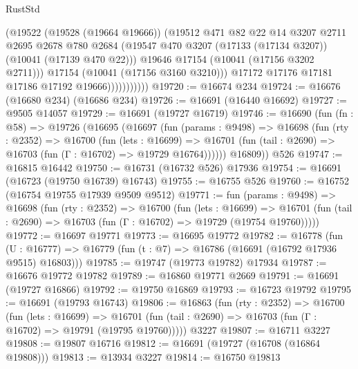 \begin{lexlean}{RustStd}
\begin{coremodule}
                          (@19522
                            (@19528 (@19664 @19666))
                            (@19512
                              @471
                              @82
                              @22
                              @14
                              @3207
                              @2711
                              @2695
                              @2678
                              @780
                              @2684
                              (@19547 @470 @3207 (@17133 (@17134 @3207)) (@10041 (@17139 @470 @22)))
                              @19646
                              @17154
                              (@10041 (@17156 @3202 @2711)))
                            @17154
                            (@10041 (@17156 @3160 @3210)))
                          @17172
                          @17176
                          @17181
                          @17186
                          @17192
                          @19666)))))))))))
@19720 := @16674 @234
@19724 := @16676 (@16680 @234) (@16686 @234)
@19726 := @16691 (@16440 @16692)
@19727 := @9505 @14057
@19729 := @16691 (@19727 @16719)
@19746 := @16690
    (fun (fn : @58) =>
    @19726
      (@16695
        (@16697
          (fun (params : @9498) =>
          @16698
            (fun (rty : @2352) =>
            @16700
              (fun (lets : @16699) =>
              @16701 (fun (tail : @2690) => @16703 (fun (Γ : @16702) => @19729 @16764))))))
        @16809))
    @526
@19747 := @16815 @16442
@19750 := @16731 (@16732 @526) @17936
@19754 := @16691 (@16723 (@19750 @16739) @16743)
@19755 := @16755 @526
@19760 := @16752 (@16754 @19755 @17939 @9509 @9512)
@19771 := fun (params : @9498) =>
  @16698
    (fun (rty : @2352) =>
    @16700
      (fun (lets : @16699) =>
      @16701 (fun (tail : @2690) => @16703 (fun (Γ : @16702) => @19729 (@19754 @19760)))))
@19772 := @16697 @19771
@19773 := @16695 @19772
@19782 := @16778
    (fun (U : @16777) => @16779 (fun (t : @7) => @16786 (@16691 (@16792 @17936 @9515) @16803)))
@19785 := @19747 (@19773 @19782) @17934
@19787 := @16676 @19772 @19782
@19789 := @16860 @19771 @2669
@19791 := @16691 (@19727 @16866)
@19792 := @19750 @16869
@19793 := @16723 @19792
@19795 := @16691 (@19793 @16743)
@19806 := @16863
    (fun (rty : @2352) =>
    @16700
      (fun (lets : @16699) =>
      @16701 (fun (tail : @2690) => @16703 (fun (Γ : @16702) => @19791 (@19795 @19760)))))
    @3227
@19807 := @16711 @3227
@19808 := @19807 @16716
@19812 := @16691 (@19727 (@16708 (@16864 @19808)))
@19813 := @13934 @3227
@19814 := @16750 @19813

\end{coremodule}
\end{lexlean}
